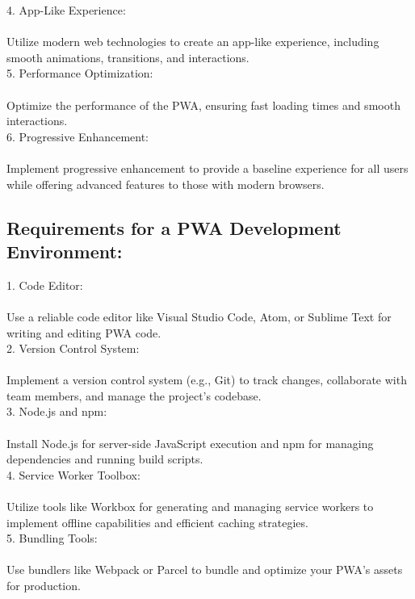 \documentclass[journal]{IEEEtran}
\begin{document}
4. App-Like Experience:\\
   \\Utilize modern web technologies to create an app-like experience, including smooth animations, transitions, and interactions.\\

5. Performance Optimization:\\
   \\Optimize the performance of the PWA, ensuring fast loading times and smooth interactions.\\

6. Progressive Enhancement:\\
   \\Implement progressive enhancement to provide a baseline experience for all users while offering advanced features to those with modern browsers.\\

\subsection{Requirements for a PWA Development Environment:}

1. Code Editor:\\
   \\Use a reliable code editor like Visual Studio Code, Atom, or Sublime Text for writing and editing PWA code.\\

2. Version Control System:\\
   \\Implement a version control system (e.g., Git) to track changes, collaborate with team members, and manage the project's codebase.\\

3. Node.js and npm:\\
   \\Install Node.js for server-side JavaScript execution and npm for managing dependencies and running build scripts.\\

4. Service Worker Toolbox:\\
   \\Utilize tools like Workbox for generating and managing service workers to implement offline capabilities and efficient caching strategies.\\

5. Bundling Tools:\\
   \\Use bundlers like Webpack or Parcel to bundle and optimize your PWA's assets for production.\\
\end{document}
